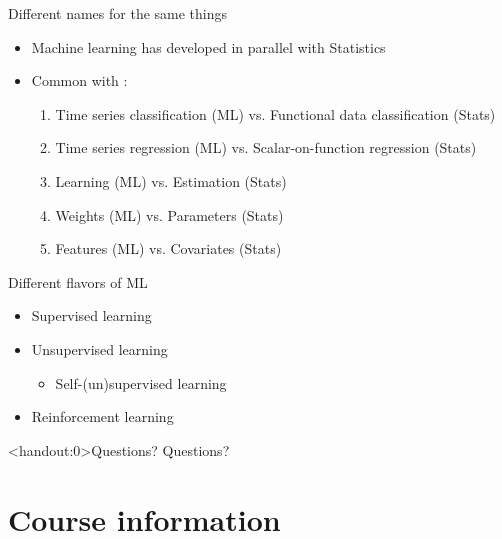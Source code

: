 \documentclass[10pt,handout]{beamer}
\begin{document}
\begin{frame}{Different names for the same things}

\begin{itemize}
\item Machine learning has developed in parallel with Statistics
\item Common with :
\begin{enumerate}
\item Time series classification (ML) vs. Functional data classification (Stats)\pause
\item Time series regression (ML) vs. Scalar-on-function
regression (Stats)\pause
\item Learning (ML) vs. Estimation (Stats)\pause
\item Weights (ML) vs. Parameters (Stats)\pause
\item Features (ML) vs. Covariates (Stats)
\end{enumerate}

\end{itemize}

\end{frame}


\begin{frame}{Different flavors of ML}

\begin{itemize}
\item Supervised learning
\item Unsupervised learning
\begin{itemize}
\item Self-(un)supervised learning
\end{itemize}
\item Reinforcement learning
\end{itemize}

\end{frame}


\begin{frame}<handout:0>{Questions?}
Questions?
\end{frame}


\section{Course information}
\frame{\sectionpage}
\end{document}

